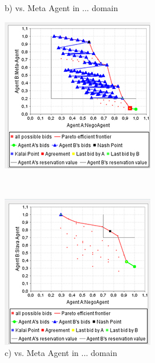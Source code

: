 \documentclass[html]{report}    %
\begin{document}
\begin{figure}
\begin{minipage}{.3\textwidth}
  \caption*{b) vs. Meta Agent in ... domain}
\end{minipage}
\begin{minipage}{.3\textwidth}
  \centering
  \includegraphics[width=.9\linewidth]{3}
  \caption*{c) vs. Meta Agent in ... domain}
\end{minipage} \\
\begin{minipage}{.3\textwidth}
  \centering
  \includegraphics[width=.9\linewidth]{4}

\end{minipage}
\end{figure}
\end{document}

